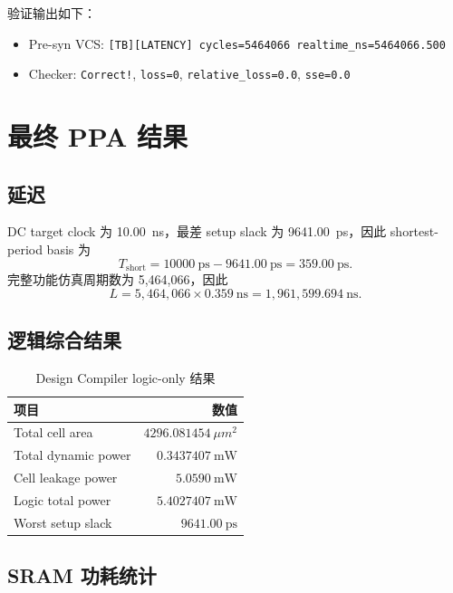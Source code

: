 \documentclass[UTF8,a4paper,zihao=-4]{ctexart}
\begin{document}
验证输出如下：
\begin{itemize}
  \item Pre-syn VCS: \texttt{[TB][LATENCY] cycles=5464066 realtime\_ns=5464066.500}
  \item Checker: \texttt{Correct!}, \texttt{loss=0}, \texttt{relative\_loss=0.0}, \texttt{sse=0.0}
\end{itemize}

\section{最终 PPA 结果}

\subsection{延迟}

DC target clock 为 \SI{10.00}{ns}，最差 setup slack 为 \SI{9641.00}{ps}，因此 shortest-period basis 为
\begin{equation}
  T_{\mathrm{short}} = 10000\ \mathrm{ps} - 9641.00\ \mathrm{ps} = 359.00\ \mathrm{ps}.
\end{equation}
完整功能仿真周期数为 5,464,066，因此
\begin{equation}
  L = 5{,}464{,}066 \times 0.359\ \mathrm{ns} = 1{,}961{,}599.694\ \mathrm{ns}.
\end{equation}

\subsection{逻辑综合结果}

\begin{table}[htbp]
\centering
\caption{Design Compiler logic-only 结果}
\begin{tabular}{lr}
\toprule
项目 & 数值 \\
\midrule
Total cell area & $4296.081454\ \mu m^2$ \\
Total dynamic power & $0.3437407\ \mathrm{mW}$ \\
Cell leakage power & $5.0590\ \mathrm{mW}$ \\
Logic total power & $5.4027407\ \mathrm{mW}$ \\
Worst setup slack & $9641.00\ \mathrm{ps}$ \\
\bottomrule
\end{tabular}
\end{table}

\subsection{SRAM 功耗统计}
\end{document}
